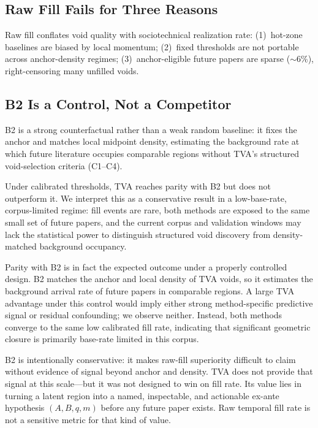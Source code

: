 \documentclass[11pt,twocolumn]{article}
\newcommand{\tva}{\textsf{TVA}}
\begin{document}
\subsection{Raw Fill Fails for Three Reasons}

Raw fill conflates void quality with sociotechnical realization rate:
(1)~hot-zone baselines are biased by local momentum;
(2)~fixed thresholds are not portable across anchor-density regimes;
(3)~anchor-eligible future papers are sparse ($\sim$6\%), right-censoring many unfilled voids.

\subsection{B2 Is a Control, Not a Competitor}

B2 is a strong counterfactual rather than a weak random baseline: it fixes the anchor
and matches local midpoint density, estimating the background rate at which future
literature occupies comparable regions without \tva{}'s structured void-selection criteria
(C1--C4).

Under calibrated thresholds, \tva{} reaches parity with B2 but does not outperform it.
We interpret this as a conservative result in a low-base-rate, corpus-limited regime: fill
events are rare, both methods are exposed to the same small set of future papers, and the
current corpus and validation windows may lack the statistical power to distinguish
structured void discovery from density-matched background occupancy.

Parity with B2 is in fact the expected outcome under a properly controlled design.
B2 matches the anchor and local density of \tva{} voids, so it estimates the background
arrival rate of future papers in comparable regions.
A large \tva{} advantage under this control would imply either strong method-specific
predictive signal or residual confounding; we observe neither.
Instead, both methods converge to the same low calibrated fill rate, indicating that
significant geometric closure is primarily base-rate limited in this corpus.

B2 is intentionally conservative: it makes raw-fill superiority difficult to claim
without evidence of signal beyond anchor and density.
\tva{} does not provide that signal at this scale---but it was not designed to win
on fill rate. Its value lies in turning a latent region into a named, inspectable,
and actionable ex-ante hypothesis $(A,B,q,m)$ before any future paper exists.
Raw temporal fill rate is not a sensitive metric for that kind of value.
\end{document}
